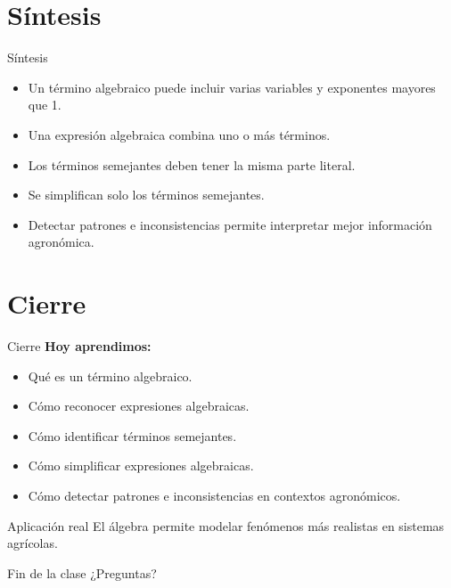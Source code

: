\documentclass[handout,aspectratio=169,12pt]{beamer}
\begin{document}
	\section{Síntesis}
	\begin{frame}{Síntesis}
		\begin{itemize}[<+->]
			\item Un término algebraico puede incluir varias variables y exponentes mayores que 1.
			\item Una expresión algebraica combina uno o más términos.
			\item Los términos semejantes deben tener la misma parte literal.
			\item Se simplifican solo los términos semejantes.
			\item Detectar patrones e inconsistencias permite interpretar mejor información agronómica.
		\end{itemize}
	\end{frame}
	
	\section{Cierre}
	\begin{frame}{Cierre}
		\textbf{Hoy aprendimos:}
		\begin{itemize}[<+->]
			\item Qué es un término algebraico.
			\item Cómo reconocer expresiones algebraicas.
			\item Cómo identificar términos semejantes.
			\item Cómo simplificar expresiones algebraicas.
			\item Cómo detectar patrones e inconsistencias en contextos agronómicos.
		\end{itemize}
		
		\pause
		\begin{block}{Aplicación real}
			El álgebra permite modelar fenómenos más realistas en sistemas agrícolas.
		\end{block}
	\end{frame}
	
	\begin{frame}{Fin de la clase}
		\centering
		\Huge ¿Preguntas?
	\end{frame}
	
\end{document}
